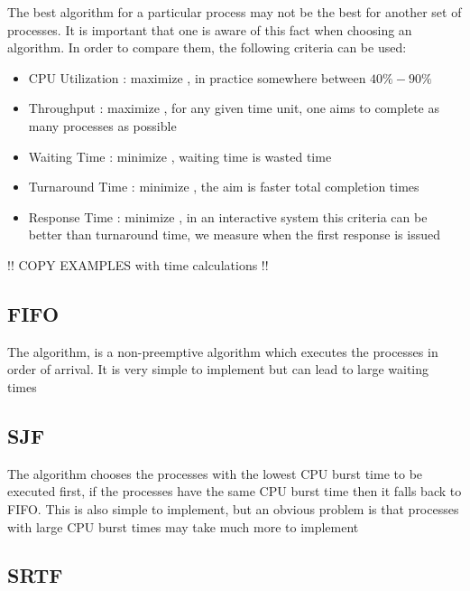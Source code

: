 		\par{The best algorithm for a particular process may not be the best for another set of processes. It is important that one is aware of this fact when choosing an algorithm. In order to compare them, the following criteria can be used:}

			\begin{itemize}
				\item[]CPU Utilization : maximize , in practice somewhere between $40\%-90\%$
				\item[]Throughput : maximize , for any given time unit, one aims to complete as many processes as possible 
				\item[]Waiting Time : minimize , waiting time is wasted time
				\item[]Turnaround Time : minimize , the aim is faster total completion times 
				\item[]Response Time : minimize , in an interactive system this criteria can be better than turnaround time, we measure when the first response is issued
			\end{itemize}

	!! COPY EXAMPLES with time calculations !!

	\subsection{FIFO}

		\par{The  algorithm, is a non-preemptive algorithm which executes the processes in order of arrival. It is very simple to implement but can lead to large waiting times}

	\subsection{SJF}

		\par{The  algorithm chooses the processes with the lowest CPU burst time to be executed first, if the processes have the same CPU burst time then it falls back to FIFO. This is also simple to implement, but an obvious problem is that processes with large CPU burst times may take much more to implement}

	\subsection{SRTF}

